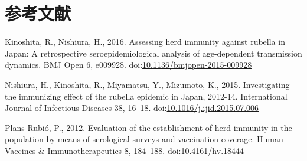 \documentclass[
  11pt,
  a4paper,
]{article}
\newlength{\cslhangindent}
\newlength{\cslentryspacingunit} %
\newenvironment{CSLReferences}[2] %
 {%
  \setlength{\parindent}{0pt}
  \ifodd #1
  \let\oldpar\par
  \def\par{\hangindent=\cslhangindent\oldpar}
  \fi
  \setlength{\parskip}{#2\cslentryspacingunit}
 }%
 {}
\begin{document}
\newpage

\hypertarget{ux53c2ux8003ux6587ux732e}{%
\section*{参考文献}\label{ux53c2ux8003ux6587ux732e}}

\hypertarget{refs}{}
\begin{CSLReferences}{1}{0}
\leavevmode{}%
Kinoshita, R., Nishiura, H., 2016. Assessing herd immunity against rubella in {Japan}: A retrospective seroepidemiological analysis of age-dependent transmission dynamics. BMJ Open 6, e009928. doi:\href{https://doi.org/10.1136/bmjopen-2015-009928}{10.1136/bmjopen-2015-009928}

\leavevmode{}%
Nishiura, H., Kinoshita, R., Miyamatsu, Y., Mizumoto, K., 2015. Investigating the immunizing effect of the rubella epidemic in {Japan}, 2012-14. International Journal of Infectious Diseases 38, 16--18. doi:\href{https://doi.org/10.1016/j.ijid.2015.07.006}{10.1016/j.ijid.2015.07.006}

\leavevmode{}%
Plans-Rubió, P., 2012. Evaluation of the establishment of herd immunity in the population by means of serological surveys and vaccination coverage. Human Vaccines \& Immunotherapeutics 8, 184--188. doi:\href{https://doi.org/10.4161/hv.18444}{10.4161/hv.18444}

\end{CSLReferences}
\end{document}
